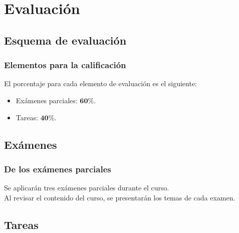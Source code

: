 \documentclass[12pt]{beamer}
\begin{document}
\section{Evaluación}
\subsection{Esquema de evaluación}

\begin{frame}
\frametitle{Elementos para la calificación}
El porcentaje para cada elemento de evaluación es el siguiente:
\pause
\begin{itemize}[<+->]
\setlength{\itemsep}{0mm}
\item[\ding{45}] Exámenes parciales: $\mathbf{60\%}$.
\item[\ding{45}] Tareas: $\mathbf{40\%}$.
\end{itemize}
\end{frame}

\subsection{Exámenes}

\begin{frame}
\frametitle{De los exámenes parciales}
Se aplicarán tres exámenes parciales durante el curso.
\\
\bigskip
Al revisar el contenido del curso, se presentarán los temas de cada examen.
\end{frame}

\subsection{Tareas}
\end{document}
